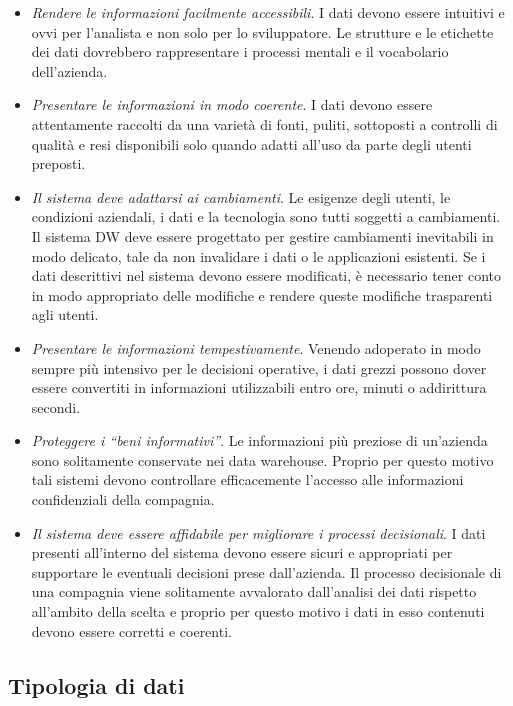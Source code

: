 \begin{itemize}
    \item \textit{Rendere le informazioni facilmente accessibili}. I dati devono essere intuitivi e ovvi per l'analista e non solo per lo sviluppatore. Le strutture e le etichette dei dati dovrebbero rappresentare i processi mentali e il vocabolario dell'azienda. 
    \item \textit{Presentare le informazioni in modo coerente}. I dati devono essere attentamente raccolti da una varietà di fonti, puliti, sottoposti a controlli di qualità e resi disponibili solo quando adatti all'uso da parte degli utenti preposti.
    \item \textit{Il sistema deve adattarsi ai cambiamenti}. Le esigenze degli utenti, le condizioni aziendali, i dati e la tecnologia sono tutti soggetti a cambiamenti. Il sistema DW deve essere progettato per gestire cambiamenti inevitabili in modo delicato, tale da non invalidare i dati o le applicazioni esistenti. Se i dati descrittivi nel sistema devono essere modificati, è necessario tener conto in modo appropriato delle modifiche e rendere queste modifiche trasparenti agli utenti.
    \item \textit{Presentare le informazioni tempestivamente}. Venendo adoperato in modo sempre più intensivo per le decisioni operative, i dati grezzi possono dover essere convertiti in informazioni utilizzabili entro ore, minuti o addirittura secondi.
    \item \textit{Proteggere i “beni informativi”}. Le informazioni più preziose di un'azienda sono solitamente conservate nei data warehouse. Proprio per questo motivo tali sistemi devono controllare efficacemente l'accesso alle informazioni confidenziali della compagnia.
    \item \textit{Il sistema deve essere affidabile per migliorare i processi decisionali}. I dati presenti all'interno del sistema devono essere sicuri e appropriati per supportare le eventuali decisioni prese dall'azienda. Il processo decisionale di una compagnia viene solitamente avvalorato dall'analisi dei dati rispetto all'ambito della scelta e proprio per questo motivo i dati in esso contenuti devono essere corretti e coerenti.
\end{itemize}

\subsection{Tipologia di dati}

